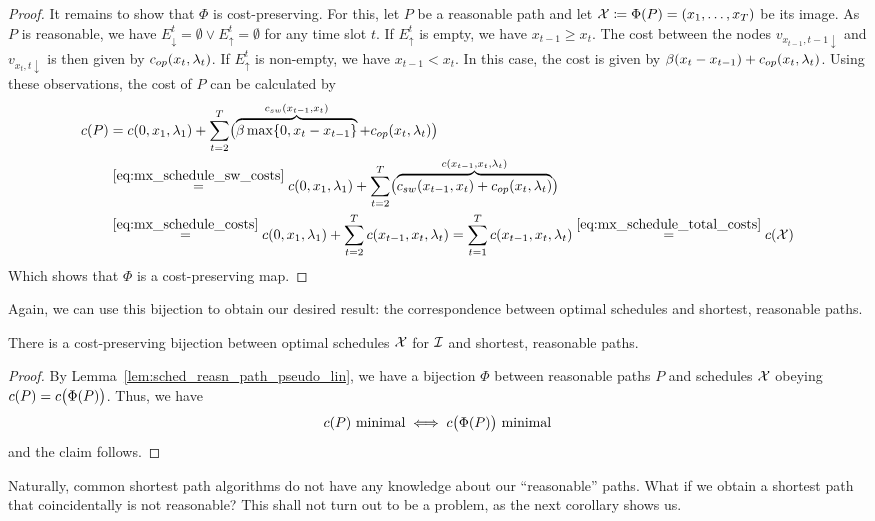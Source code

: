 \begin{proof}
It remains to show that $\Phi$ is cost-preserving. For this, let $P$ be a reasonable path and let $\mathcal{X}\coloneqq\Phi(P)=(x_1,\ldots,x_T)$ be its image. 
As $P$ is reasonable, we have $E_\downarrow^t=\emptyset \lor E_\uparrow^t=\emptyset$ for any time slot $t$. If $E_\uparrow^t$ is empty, we have $x_{t-1}\ge x_t$. The cost between the nodes $v_{x_{t-1},t-1\downarrow}$ and $v_{x_t,t\downarrow}$ is then given by $c_{op}(x_t,\lambda_t)$. If $E_\uparrow^t$ is non-empty, we have $x_{t-1}<x_t$. In this case, the cost is given by $\beta(x_t-x_{t-1})+c_{op}(x_t,\lambda_t)$. Using these observations, the cost of $P$ can be calculated by 
\begin{align*}
	c(P)&=c(0,x_1,\lambda_1)+\sum\limits_{t=2}^{T}\bigl(\overbrace{\beta\max\{0,x_t-x_{t-1}\}}^{c_{sw}(x_{t-1},x_t)}+c_{op}(x_{t},\lambda_t)\bigr)\\
	&\stackrel{\eqref{eq:mx_schedule_sw_costs}}{=}c(0,x_1,\lambda_1)+\sum\limits_{t=2}^{T}\bigl(\overbrace{c_{sw}(x_{t-1},x_t)+c_{op}(x_{t},\lambda_t)}^{c(x_{t-1},x_t,\lambda_t)}\bigr)\\
	&\stackrel{\eqref{eq:mx_schedule_costs}}{=}c(0,x_1,\lambda_1)+\sum\limits_{t=2}^{T}c(x_{t-1},x_t,\lambda_t)=\sum\limits_{t=1}^{T}c(x_{t-1},x_t,\lambda_t)\stackrel{\eqref{eq:mx_schedule_total_costs}}{=}c(\mathcal{X})
\end{align*}
Which shows that $\Phi$ is a cost-preserving map.
\end{proof}
Again, we can use this bijection to obtain our desired result: the correspondence between optimal schedules and shortest, reasonable paths.
\begin{thm}\label{thm:opt_sched_reasn_path}
There is a cost-preserving bijection between optimal schedules $\mathcal{X}$ for $\mathcal{I}$ and shortest, reasonable paths.
\end{thm} 
\begin{proof}
By Lemma~\ref{lem:sched_reasn_path_pseudo_lin}, we have a bijection $\Phi$ between reasonable paths $P$ and schedules $\mathcal{X}$ obeying $c(P)=c\bigl(\Phi(P)\bigr)$. Thus, we have 
\begin{equation*}
	c(P)\text{ minimal}\iff c\bigl(\Phi(P)\big)\text{ minimal}
\end{equation*}
and the claim follows.
\end{proof}
Naturally, common shortest path algorithms do not have any knowledge about our ``reasonable'' paths. What if we obtain a shortest path that coincidentally is not reasonable? This shall not turn out to be a problem, as the next corollary shows us.
